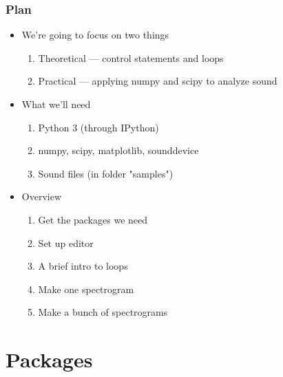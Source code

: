 \documentclass{beamer}\usepackage[]{graphicx}\usepackage[]{color}
\begin{document}
\begin{frame}
\frametitle{Plan}
\begin{itemize}
	\item We're going to focus on two things 

	\begin{enumerate}
		\item Theoretical --- control statements and loops

		\item Practical --- applying numpy and scipy to analyze sound 
	\end{enumerate}

	\item What we'll need
	\begin{enumerate}
		\item Python 3 (through IPython)

		\item numpy, scipy, matplotlib, sounddevice

		\item Sound files (in folder "samples") 
	\end{enumerate}

	\item Overview
	\begin{enumerate}
		\item Get the packages we need

		\item Set up editor 

		\item A brief intro to loops

		\item Make one spectrogram

		\item Make a bunch of spectrograms
	\end{enumerate}
\end{itemize}
\end{frame}

\section{Packages}
\end{document}
